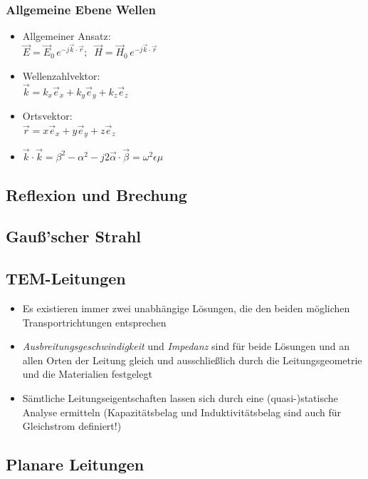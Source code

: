 {	 \subsubsection{Allgemeine Ebene Wellen}
	 \begin{itemize}
	 	\itemsep0pt
		\item Allgemeiner Ansatz:\\
		\(\vec{E} = \vec{E}_0\,e^{-j\vec{k}\cdot\vec{r}};\;\;\vec{H} = \vec{H}_0\,e^{-j\vec{k}\cdot\vec{r}}\)
		\item Wellenzahlvektor:\\
		\(\vec{k} = k_x\vec{e}_x + k_y\vec{e}_y + k_z\vec{e}_z\)
		\item Ortsvektor:\\
		\(\vec{r} = x\vec{e}_x + y\vec{e}_y + z\vec{e}_z\)
		\item \(\vec{k}\cdot\vec{k} = \beta^2 - \alpha^2 - j2\vec{\alpha}\cdot\vec{\beta} = \omega^2\epsilon\mu\)
	 \end{itemize}

 \subsection{Reflexion und Brechung}
 \subsection{Gauß'scher Strahl}
 \subsection{TEM-Leitungen}
  \begin{itemize}
     \itemsep0pt
     \item Es existieren immer zwei unabhängige Lösungen, die den beiden möglichen Transportrichtungen entsprechen
     \item \textit{Ausbreitungsgeschwindigkeit} und \textit{Impedanz} sind für beide Lösungen und an allen Orten der Leitung gleich und ausschließlich durch die Leitungsgeometrie und die Materialien festgelegt
     \item Sämtliche Leitungseigentschaften lassen sich durch eine (quasi-)statische Analyse ermitteln (Kapazitätsbelag und Induktivitätsbelag sind auch für Gleichstrom definiert!)
 \end{itemize}
 \subsection{Planare Leitungen}
 }
